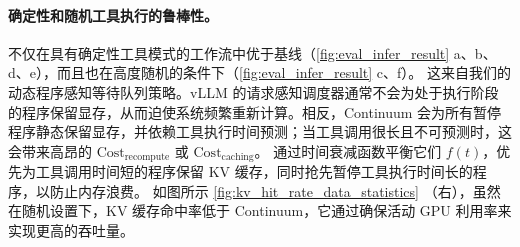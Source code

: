 \paragraph{确定性和随机工具执行的鲁棒性。}
\ouralg 不仅在具有确定性工具模式的工作流中优于基线（\autoref{fig:eval_infer_result} a、b、d、e），而且也在高度随机的条件下（\autoref{fig:eval_infer_result} c、f）。
这来自我们的动态程序感知等待队列策略。vLLM 的请求感知调度器通常不会为处于执行阶段的程序保留显存，从而迫使系统频繁重新计算。相反，Continuum 会为所有暂停程序静态保留显存，并依赖工具执行时间预测；当工具调用很长且不可预测时，这会带来高昂的 $\text{Cost}_{\text{recompute}}$ 或 $\text{Cost}_{\text{caching}}$。
\ouralg 通过时间衰减函数平衡它们 $f(t)$，优先为工具调用时间短的程序保留 KV 缓存，同时抢先暂停工具执行时间长的程序，以防止内存浪费。
如图所示 \autoref{fig:kv_hit_rate_data_statistics} （右），虽然 \ouralg 在随机设置下，KV 缓存命中率低于 Continuum，它通过确保活动 GPU 利用率来实现更高的吞吐量。




